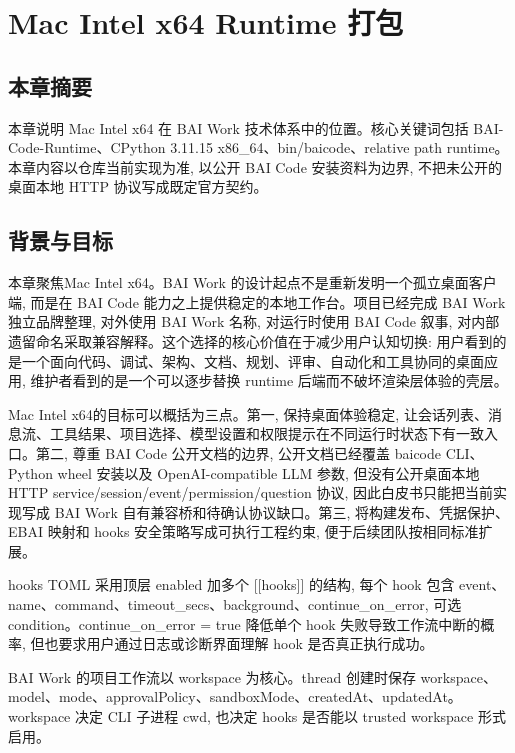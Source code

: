 \chapter{Mac Intel x64 Runtime 打包}
\section{本章摘要}
本章说明 Mac Intel x64 在 BAI Work 技术体系中的位置。核心关键词包括 BAI-Code-Runtime、CPython 3.11.15 x86\_64、bin/baicode、relative path runtime。本章内容以仓库当前实现为准, 以公开 BAI Code 安装资料为边界, 不把未公开的桌面本地 HTTP 协议写成既定官方契约。

\section{背景与目标}
本章聚焦Mac Intel x64。BAI Work 的设计起点不是重新发明一个孤立桌面客户端, 而是在 BAI Code 能力之上提供稳定的本地工作台。项目已经完成 BAI Work 独立品牌整理, 对外使用 BAI Work 名称, 对运行时使用 BAI Code 叙事, 对内部遗留命名采取兼容解释。这个选择的核心价值在于减少用户认知切换: 用户看到的是一个面向代码、调试、架构、文档、规划、评审、自动化和工具协同的桌面应用, 维护者看到的是一个可以逐步替换 runtime 后端而不破坏渲染层体验的壳层。

Mac Intel x64的目标可以概括为三点。第一, 保持桌面体验稳定, 让会话列表、消息流、工具结果、项目选择、模型设置和权限提示在不同运行时状态下有一致入口。第二, 尊重 BAI Code 公开文档的边界, 公开文档已经覆盖 baicode CLI、Python wheel 安装以及 OpenAI-compatible LLM 参数, 但没有公开桌面本地 HTTP service/session/event/permission/question 协议, 因此白皮书只能把当前实现写成 BAI Work 自有兼容桥和待确认协议缺口。第三, 将构建发布、凭据保护、EBAI 映射和 hooks 安全策略写成可执行工程约束, 便于后续团队按相同标准扩展。

hooks TOML 采用顶层 enabled 加多个 [[hooks]] 的结构, 每个 hook 包含 event、name、command、timeout\_secs、background、continue\_on\_error, 可选 condition。continue\_on\_error = true 降低单个 hook 失败导致工作流中断的概率, 但也要求用户通过日志或诊断界面理解 hook 是否真正执行成功。

BAI Work 的项目工作流以 workspace 为核心。thread 创建时保存 workspace、model、mode、approvalPolicy、sandboxMode、createdAt、updatedAt。workspace 决定 CLI 子进程 cwd, 也决定 hooks 是否能以 trusted workspace 形式启用。


